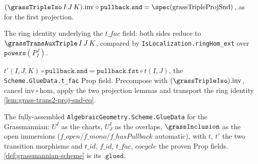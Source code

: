 \begin{lemma}

  \label{lem:grass-triple-iso-inv-snd}
  $(\grassTripleIso\,I\,J\,K).\mathrm{inv}\circ\mathtt{pullback.snd} =
  \spec(\mathrm{grassTripleProjSnd})$, as for the first projection.
\end{lemma}

\begin{lemma}

  \label{lem:grass-trans2-proj-snd-eq}
  The ring identity underlying the $t\_fac$ field: both sides reduce to
  $\grassTransAuxTriple\,I\,J\,K$, compared by
  \texttt{IsLocalization.ringHom\_ext} over $\mathtt{powers}(P^J_I)$.
\end{lemma}

\begin{lemma}

  \label{lem:grass-trans-morphism2-tfac}
  $t'(I,J,K)\circ\mathtt{pullback.snd} = \mathtt{pullback.fst}\circ t(I,J)$, the
  \texttt{Scheme.GlueData.t\_fac} Prop field. Precompose with
  $(\grassTripleIso).\mathrm{inv}$, cancel $\mathrm{inv}\circ\mathrm{hom}$, apply the
  two projection lemmas and transport the ring identity
  \cref{lem:grass-trans2-proj-snd-eq}.
\end{lemma}

\begin{definition}

  \label{def:grass-glue-data}
  The fully-assembled \texttt{AlgebraicGeometry.Scheme.GlueData} for the
  Grassmannian: $U^I$ as the charts, $U^I_J$ as the overlaps, $\grassInclusion$ as
  the open immersions ($f\_open$/$f\_mono$/$f\_hasPullback$ automatic), with $t$,
  $t'$ the two transition morphisms and $t\_id$, $f\_id$, $t\_fac$, $cocycle$ the
  proven Prop fields. \cref{def:grassmannian-scheme} is its $\mathtt{.glued}$.
\end{definition}

